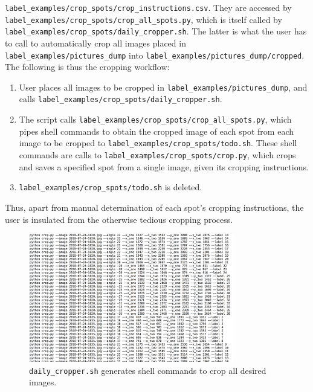 \documentclass[a4paper, 11pt]{article} %
\begin{document}
		\texttt{label\_examples/crop\_spots/crop\_instructions.csv}. They are 
		accessed by
		\texttt{label\_examples/crop\_spots/crop\_all\_spots.py}, which is itself called by
		\texttt{label\_examples/crop\_spots/daily\_cropper.sh}. The latter is what the user has to call to automatically
		crop all images placed in \texttt{label\_examples/pictures\_dump} into \texttt{label\_examples/pictures\_dump/cropped}.
		The following is thus the cropping workflow:
		\begin{enumerate}
			\item User places all images to be cropped in \texttt{label\_examples/pictures\_dump}, and calls
			\texttt{label\_examples/crop\_spots/daily\_cropper.sh}. 
			\item The script calls \texttt{label\_examples/crop\_spots/crop\_all\_spots.py}, which pipes
			shell commands to obtain the cropped image of each spot from each image to be cropped to
			\texttt{label\_examples/crop\_spots/todo.sh}. These shell commands are calls to
			\texttt{label\_examples/crop\_spots/crop.py}, which crops and saves a specified spot from a
			single image, given its cropping instructions.
			\item \texttt{label\_examples/crop\_spots/todo.sh} is deleted.
		\end{enumerate}
		Thus, apart from manual determination of each spot's cropping instructions, the user is insulated from
		the otherwise tedious cropping process.
		\begin{figure}[H]
			\centering
			\includegraphics[width=0.8\textwidth]{figures/daily_cropper_example}
			\caption{\texttt{daily\_cropper.sh} generates shell commands to 
			crop all desired images.}
		\end{figure}
\end{document}
